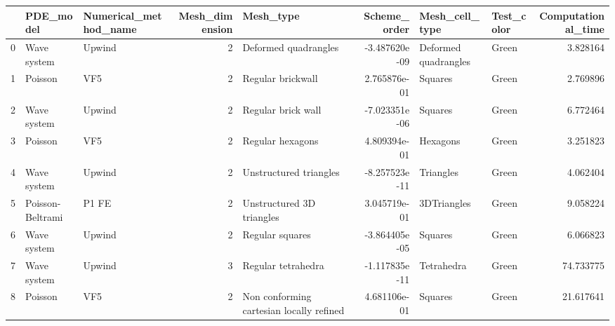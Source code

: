 \begin{tabular}{lllrlrllr}
\toprule
{} &         PDE\_model & Numerical\_method\_name &  Mesh\_dimension &                                 Mesh\_type &  Scheme\_order &        Mesh\_cell\_type &                           Test\_color &  Computational\_time \\
\midrule
0  &       Wave system &                Upwind &               2 &                      Deformed quadrangles & -3.487620e-09 &  Deformed quadrangles &                                Green &            3.828164 \\
1  &           Poisson &                   VF5 &               2 &                         Regular brickwall &  2.765876e-01 &               Squares &                                Green &            2.769896 \\
2  &       Wave system &                Upwind &               2 &                        Regular brick wall & -7.023351e-06 &               Squares &                                Green &            6.772464 \\
3  &           Poisson &                   VF5 &               2 &                          Regular hexagons &  4.809394e-01 &              Hexagons &                                Green &            3.251823 \\
4  &       Wave system &                Upwind &               2 &                    Unstructured triangles & -8.257523e-11 &             Triangles &                                Green &            4.062404 \\
5  &  Poisson-Beltrami &                 P1 FE &               2 &                 Unstructured 3D triangles &  3.045719e-01 &           3DTriangles &                                Green &            9.058224 \\
6  &       Wave system &                Upwind &               2 &                           Regular squares & -3.864405e-05 &               Squares &                                Green &            6.066823 \\
7  &       Wave system &                Upwind &               3 &                        Regular tetrahedra & -1.117835e-11 &            Tetrahedra &                                Green &           74.733775 \\
8  &           Poisson &                   VF5 &               2 &  Non conforming cartesian locally refined &  4.681106e-01 &               Squares &                                Green &           21.617641 \\

\end{tabular}
